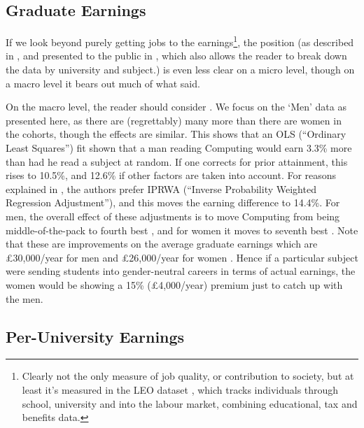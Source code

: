 \documentclass[sigconf]{acmart}
\begin{document}
\subsection{Graduate Earnings}
If we look beyond purely getting jobs to the earnings\footnote{Clearly
not the only measure of job quality, or contribution to society, but
at least it's measured in the LEO dataset
\cite{DfE2017a}, which tracks individuals through school, university
and into the labour market, combining educational, tax and benefits
data.}, the position (as described in \cite{DfE2018d}, and presented
to the public in \cite{BBC2018f}, which also allows the reader to
break down the data by university and subject.) is even less clear on
a micro level, though on a macro level it bears out much
of what \cite{Shadbolt2016a} said.

On the macro level, the reader should consider \cite[Table
5]{DfE2018d}. We focus on the `Men' data as presented here, as there
are (regrettably) many more than there are women in the cohorts,
though the effects are similar. This shows that an OLS (``Ordinary
Least Squares'') fit shown that a man reading Computing would earn
3.3\% more than had he read a subject at random. If one corrects for
prior attainment, this rises to 10.5\%, and 12.6\% if other factors
are taken into account. For reasons explained in
\cite[\S4.2]{DfE2018d}, the authors prefer IPRWA (``Inverse
Probability Weighted Regression Adjustment''), and this moves the
earning difference to 14.4\%. For men, the overall effect of these
adjustments is to move Computing from being middle-of-the-pack
\cite[Figure 15]{DfE2018d} to fourth best \cite[Figure 17]{DfE2018d},
and for women it moves to seventh best \cite[Figure
16]{DfE2018d}. Note that these are improvements on the average
graduate earnings which are \pounds30,000/year for men and
\pounds26,000/year for women \cite[p. 37]{DfE2018d}. Hence if a
particular subject were sending students into gender-neutral careers in terms of actual earnings,
the women would be showing a 15\% (\pounds4,000/year) premium just to
catch up with the men.

\subsection{Per-University Earnings}
\end{document}
